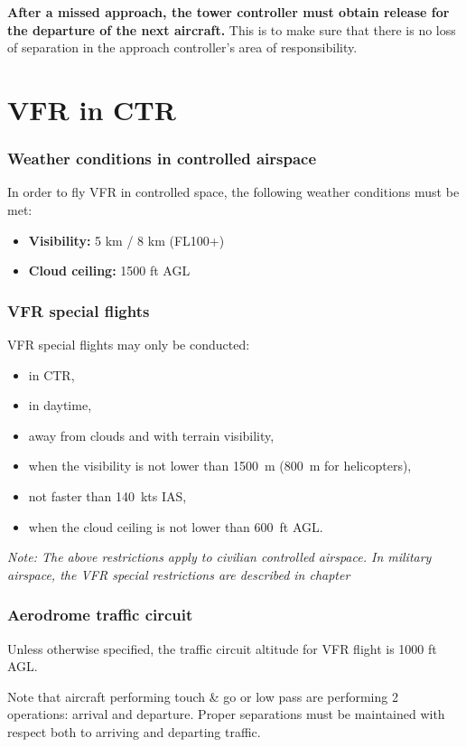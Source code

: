 \textbf{After a missed approach, the tower controller must obtain release for the departure of the next aircraft.} This is to make sure that there is no loss of separation in the approach controller's area of responsibility.

\section{VFR in CTR}
\subsubsection{Weather conditions in controlled airspace}
In order to fly VFR in controlled space, the following weather conditions must be met:
\begin{itemize}
    \item \textbf{Visibility:} 5 km / 8 km (FL100+)
    \item \textbf{Cloud ceiling:} 1500 ft AGL
\end{itemize}

\subsubsection{VFR special flights}

VFR special flights may only be conducted:
\begin{itemize}
    \item in CTR,
    \item in daytime,
    \item away from clouds and with terrain visibility,
    \item when the visibility is not lower than 1500~m (800~m for helicopters),
    \item not faster than 140~kts IAS,
    \item when the cloud ceiling is not lower than 600~ft AGL.
\end{itemize}

\emph{Note: The above restrictions apply to civilian controlled airspace. In military airspace, the VFR special restrictions are described in chapter }

\subsubsection{Aerodrome traffic circuit}
Unless otherwise specified, the traffic circuit altitude for VFR flight is 1000 ft AGL.

Note that aircraft performing touch \& go or low pass are performing 2 operations: arrival and departure. Proper separations must be maintained with respect both to arriving and departing traffic.

